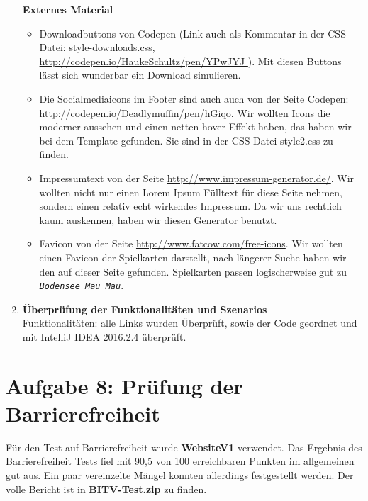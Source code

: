 \documentclass{scrartcl}
\newcommand{\BMM}{\texttt{\textit{Bodensee Mau Mau}}}
\begin{document}
\begin{enumerate}
\textbf{Externes Material}
\begin{itemize}
\item Downloadbuttons von Codepen (Link auch als Kommentar in der CSS-Datei: style-downloads.css, \url{http://codepen.io/HaukeSchultz/pen/YPwJYJ }). Mit diesen Buttons lässt sich wunderbar ein Download simulieren.
\item Die Socialmediaicons im Footer sind auch auch von der Seite Codepen: \url{http://codepen.io/Deadlymuffin/pen/hGiqo}. Wir wollten Icons die moderner aussehen und einen netten hover-Effekt haben, das haben wir bei dem Template gefunden. Sie sind in der CSS-Datei style2.css zu finden.
\item Impressumtext von der Seite \url{http://www.impressum-generator.de/}. Wir wollten nicht nur einen Lorem Ipsum Fülltext für diese Seite nehmen, sondern einen relativ echt wirkendes Impressum. Da wir uns rechtlich kaum auskennen, haben wir diesen Generator benutzt.
\item Favicon von der Seite \url{http://www.fatcow.com/free-icons}. Wir wollten einen Favicon der Spielkarten darstellt, nach längerer Suche haben wir den auf dieser Seite gefunden. Spielkarten passen logischerweise gut zu \BMM .
\end{itemize}
\item \textbf{Überprüfung der Funktionalitäten und Szenarios}\\
Funktionalitäten: alle Links wurden Überprüft, sowie der Code geordnet und mit IntelliJ IDEA 2016.2.4 überprüft. 

\end{enumerate}
\section*{Aufgabe 8: Prüfung der Barrierefreiheit}
Für den Test auf Barrierefreiheit wurde \textbf{WebsiteV1} verwendet.
Das Ergebnis des Barrierefreiheit Tests fiel mit 90,5 von 100 erreichbaren Punkten im allgemeinen gut aus. Ein paar vereinzelte Mängel konnten allerdings festgestellt werden. Der volle Bericht ist in \textbf{BITV-Test.zip} zu finden.
\end{document}
